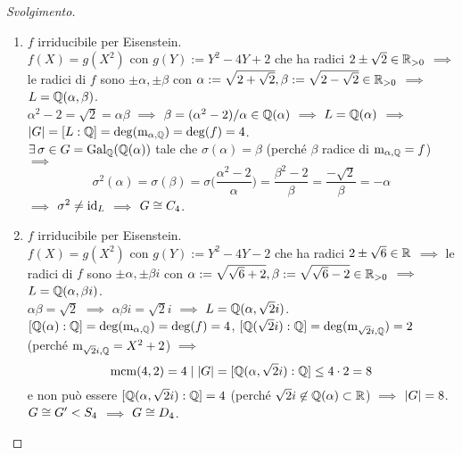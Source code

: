 \begin{proof}[Svolgimento]
\begin{enumerate}
\item $f$ irriducibile per Eisenstein. \\
$f(X)=g(X^2)$ con $g(Y):=Y^2-4Y+2$ che ha radici $2\pm\sqrt{2}\in\R_{>0}$ $\implies$ le radici di $f$ sono $\pm\alpha,\pm\beta$ con $\alpha:=\sqrt{2+\sqrt{2}},\beta:=\sqrt{2-\sqrt{2}}\in\R_{>0}$ $\implies$ $L=\Q(\alpha,\beta)$. \\
$\alpha^2-2=\sqrt{2}=\alpha\beta$ $\implies$ $\beta=(\alpha^2-2)/\alpha\in\Q(\alpha)$ $\implies$ $L=\Q(\alpha)$ $\implies$ $\card{G}=[L:\Q]=\deg(\polmin_{\alpha,\Q})=\deg(f)=4$. \\
$\exi\sigma\in G=\Gal[\Q]{\Q(\alpha)}$ tale che $\sigma(\alpha)=\beta$ (perché $\beta$ radice di $\polmin_{\alpha,\Q}=f$) $\implies$
\[
\sigma^2(\alpha)=\sigma(\beta)=\sigma\biggl(\frac{\alpha^2-2}{\alpha}\biggr)=\frac{\beta^2-2}{\beta}=\frac{-\sqrt{2}}{\beta}=-\alpha
\]
$\implies$ $\sigma^2\ne\id_L$ $\implies$ $G\iso C_4$.
\item $f$ irriducibile per Eisenstein. \\
$f(X)=g(X^2)$ con $g(Y):=Y^2-4Y-2$ che ha radici $2\pm\sqrt{6}\in\R$ $\implies$ le radici di $f$ sono $\pm\alpha,\pm\beta i$ con $\alpha:=\sqrt{\sqrt{6}+2},\beta:=\sqrt{\sqrt{6}-2}\in\R_{>0}$ $\implies$ $L=\Q(\alpha,\beta i)$. \\
$\alpha\beta=\sqrt{2}$ $\implies$ $\alpha\beta i=\sqrt{2}i$ $\implies$ $L=\Q(\alpha,\sqrt{2}i)$. \\
$[\Q(\alpha):\Q]=\deg(\polmin_{\alpha,\Q})=\deg(f)=4$, $[\Q(\sqrt{2}i):\Q]=\deg(\polmin_{\sqrt{2}i,\Q})=2$ (perché $\polmin_{\sqrt{2}i,\Q}=X^2+2$) $\implies$ 
\[
\mcm(4,2)=4\dvd\card{G}=[\Q(\alpha,\sqrt{2}i):\Q]\le4\cdot2=8
\]
e non pu\`o essere $[\Q(\alpha,\sqrt{2}i):\Q]=4$ (perché $\sqrt{2}i\not\in\Q(\alpha)\subset\R$) $\implies$ $\card{G}=8$. \\
$G\iso G'<S_4$ $\implies$ $G\iso D_4$. \qedhere
\end{enumerate}
\end{proof}








